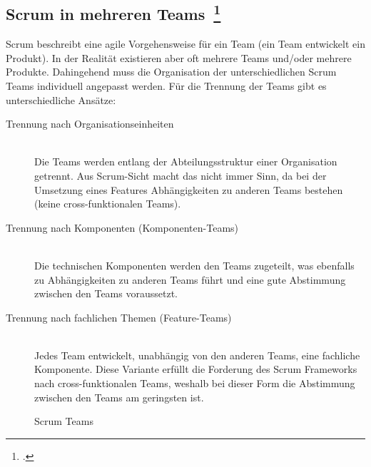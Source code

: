 \clearpage
\subsection[Scrum in mehreren Teams]{Scrum in mehreren Teams~\footcite[vgl.][S.172ff]{scrum_kurz_gut_2013}}

Scrum beschreibt eine agile Vorgehensweise für ein Team (ein Team entwickelt ein Produkt).
In der Realität existieren aber oft mehrere Teams und/oder mehrere Produkte. 
Dahingehend muss die Organisation der unterschiedlichen Scrum Teams individuell angepasst werden.
Für die Trennung der Teams gibt es unterschiedliche Ansätze:
\begin{description}
  \item[Trennung nach Organisationseinheiten] \hfill \\ Die Teams werden entlang der Abteilungsstruktur einer Organisation getrennt. Aus Scrum-Sicht macht das nicht immer Sinn, da bei der Umsetzung eines Features Abhängigkeiten zu anderen Teams bestehen (keine cross-funktionalen Teams).
  \item[Trennung nach Komponenten (Komponenten-Teams)] \hfill \\ Die technischen Komponenten werden den Teams zugeteilt, was ebenfalls zu Abhängigkeiten zu anderen Teams führt und eine gute Abstimmung zwischen den Teams voraussetzt.
  \item[Trennung nach fachlichen Themen (Feature-Teams)] \hfill \\ Jedes Team entwickelt, unabhängig von den anderen Teams, eine fachliche Komponente. Diese Variante erfüllt die Forderung des Scrum Frameworks nach cross-funktionalen Teams, weshalb bei dieser Form die Abstimmung zwischen den Teams am geringsten ist.
\end{description}

\begin{savenotes}
  \begin{figure}[H]
    \centering
  \caption{Scrum Teams}\label{fig:Scrum Teams}
  \end{figure}
\end{savenotes}

